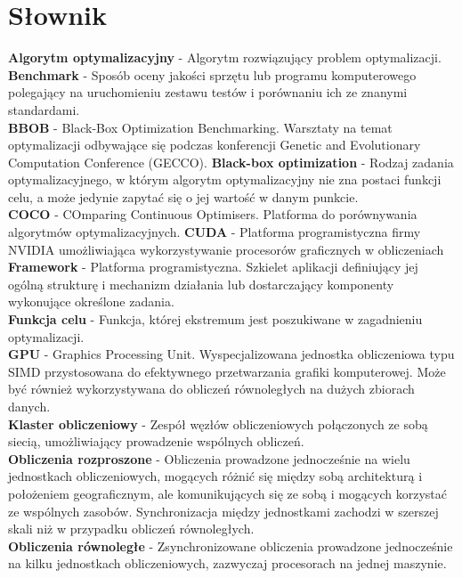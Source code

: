 \documentclass[12pt, twoside, openany, abstract=on]{report}
\theoremstyle{definition}
\begin{document}

\chapter{Słownik}

\textbf{Algorytm optymalizacyjny} - Algorytm rozwiązujący problem optymalizacji.\\
\textbf{Benchmark} - Sposób oceny jakości sprzętu lub programu komputerowego polegający na uruchomieniu zestawu testów i porównaniu ich ze znanymi standardami.\\
\textbf{BBOB} - Black-Box Optimization Benchmarking. Warsztaty na temat optymalizacji odbywające się podczas konferencji Genetic and Evolutionary Computation Conference (GECCO).
\textbf{Black-box optimization} - Rodzaj zadania optymalizacyjnego, w którym algorytm optymalizacyjny nie zna postaci funkcji celu, a może jedynie zapytać się o jej wartość w danym punkcie.\\
\textbf{COCO} - COmparing Continuous Optimisers. Platforma do porównywania algorytmów optymalizacyjnych.
\textbf{CUDA} - Platforma programistyczna firmy NVIDIA umożliwiająca wykorzystywanie procesorów graficznych w obliczeniach\\
\textbf{Framework} - Platforma programistyczna. Szkielet aplikacji definiujący jej ogólną strukturę i mechanizm działania lub dostarczający komponenty wykonujące określone zadania.\\
\textbf{Funkcja celu} - Funkcja, której ekstremum jest poszukiwane w zagadnieniu optymalizacji.\\
\textbf{GPU} - Graphics Processing Unit. Wyspecjalizowana jednostka obliczeniowa typu SIMD przystosowana do efektywnego przetwarzania grafiki komputerowej. Może być również wykorzystywana do obliczeń równoległych na dużych zbiorach danych.\\
\textbf{Klaster obliczeniowy} - Zespół węzłów obliczeniowych połączonych ze sobą siecią, umożliwiający prowadzenie wspólnych obliczeń.\\
\textbf{Obliczenia rozproszone} - Obliczenia prowadzone jednocześnie na wielu jednostkach obliczeniowych, mogących różnić się między sobą architekturą i położeniem geograficznym, ale komunikujących się ze sobą i mogących korzystać ze wspólnych zasobów. Synchronizacja między jednostkami zachodzi w szerszej skali niż w przypadku obliczeń równoległych.\\
\textbf{Obliczenia równoległe} - Zsynchronizowane obliczenia prowadzone jednocześnie na kilku jednostkach obliczeniowych, zazwyczaj procesorach na jednej maszynie.\\
\end{document}

